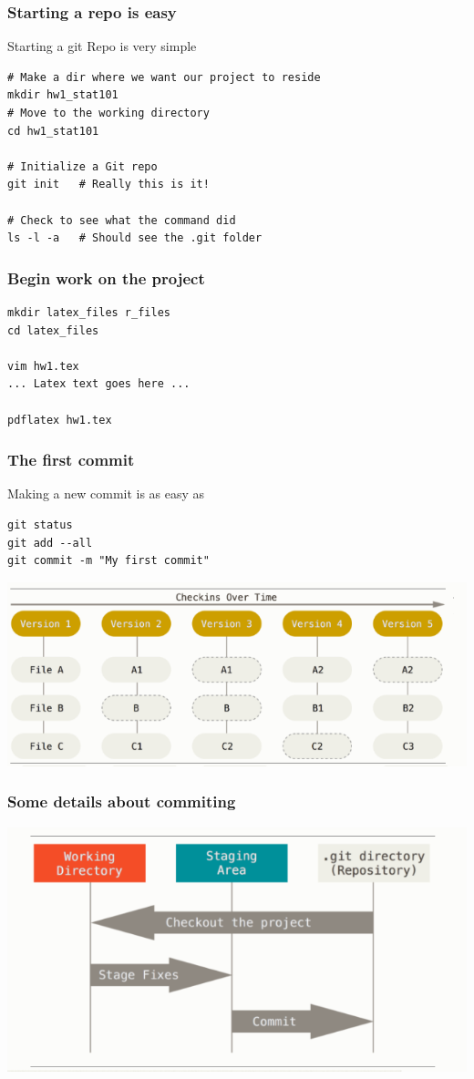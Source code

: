 \documentclass{beamer}
\begin{document}
\begin{frame}[fragile]
\frametitle{Starting a repo is easy}
Starting a git Repo is very simple
\begin{verbatim}
# Make a dir where we want our project to reside
mkdir hw1_stat101 
# Move to the working directory
cd hw1_stat101

# Initialize a Git repo
git init   # Really this is it!

# Check to see what the command did
ls -l -a   # Should see the .git folder
\end{verbatim}
\end{frame}


\begin{frame}[fragile]
\frametitle{Begin work on the project}
\begin{verbatim}
mkdir latex_files r_files
cd latex_files

vim hw1.tex
... Latex text goes here ...

pdflatex hw1.tex
\end{verbatim}
\end{frame}


\begin{frame}[fragile]
\frametitle{The first commit}
Making a new commit is as easy as 
\begin{verbatim}
git status
git add --all
git commit -m "My first commit"
\end{verbatim}

\centering
\includegraphics[scale = 0.4]{workflowRecall}


\end{frame}


\begin{frame}
\frametitle{Some details about commiting}
\centering
\includegraphics[scale = 0.6]{commitWorkflow}
\end{frame}
\end{document}
